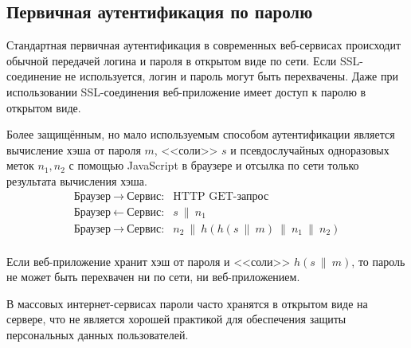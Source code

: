 \subsection{Первичная аутентификация по паролю}

Стандартная первичная аутентификация в современных веб-сервисах происходит обычной передачей логина и пароля в открытом виде по сети. Если SSL-соединение не используется, логин и пароль могут быть перехвачены. Даже при использовании SSL-соединения веб-приложение имеет доступ к паролю в открытом виде.

Более защищённым, но мало используемым способом аутентификации является вычисление хэша от пароля $m$, <<соли>> $s$ и псевдослучайных одноразовых меток $n_1, n_2$ с помощью JavaScript в браузере и отсылка по сети только результата вычисления хэша.
\[ \begin{array}{ll}
    \text{Браузер} ~\rightarrow~ \text{Сервис:} & \text{HTTP GET-запрос} \\
    \text{Браузер} ~\leftarrow~ \text{Сервис:}  & s ~\|~ n_1 \\
    \text{Браузер} ~\rightarrow~ \text{Сервис:} & n_2 ~\|~ h( h(s ~\|~ m) ~\|~ n_1 ~\|~ n_2) \\
\end{array} \]

Если веб-приложение хранит хэш от пароля и <<соли>> $h(s ~\|~ m)$, то пароль не может быть перехвачен ни по сети, ни веб-приложением.

В массовых интернет-сервисах пароли часто хранятся в открытом виде на сервере, что не является хорошей практикой для обеспечения защиты персональных данных пользователей.




